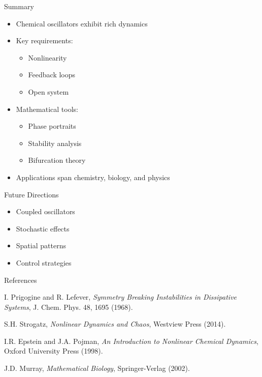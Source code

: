 \documentclass{beamer}
\begin{document}
\begin{frame}{Summary}
\begin{itemize}
    \item Chemical oscillators exhibit rich dynamics
    \item Key requirements:
    \begin{itemize}
        \item Nonlinearity
        \item Feedback loops
        \item Open system
    \end{itemize}
    \item Mathematical tools:
    \begin{itemize}
        \item Phase portraits
        \item Stability analysis
        \item Bifurcation theory
    \end{itemize}
    \item Applications span chemistry, biology, and physics
\end{itemize}

\begin{block}{Future Directions}
\begin{itemize}
    \item Coupled oscillators
    \item Stochastic effects
    \item Spatial patterns
    \item Control strategies
\end{itemize}
\end{block}
\end{frame}

\begin{frame}{References}
\begin{thebibliography}{9}
I. Prigogine and R. Lefever,
\textit{Symmetry Breaking Instabilities in Dissipative Systems},
J. Chem. Phys. 48, 1695 (1968).

S.H. Strogatz,
\textit{Nonlinear Dynamics and Chaos},
Westview Press (2014).

I.R. Epstein and J.A. Pojman,
\textit{An Introduction to Nonlinear Chemical Dynamics},
Oxford University Press (1998).

J.D. Murray,
\textit{Mathematical Biology},
Springer-Verlag (2002).
\end{thebibliography}
\end{frame}
\end{document}
